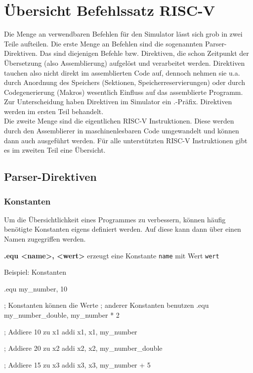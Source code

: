 
\section{Übersicht Befehlssatz RISC-V}

Die Menge an verwendbaren Befehlen für den Simulator lässt sich grob in zwei
Teile aufteilen. Die erste Menge an Befehlen sind die sogenannten
Parser-Direktiven. Das sind diejenigen Befehle bzw. Direktiven, die schon 
Zeitpunkt der Übersetzung (also Assemblierung) aufgelöst und verarbeitet werden.
Direktiven tauchen also nicht direkt im assemblierten Code auf, dennoch nehmen
sie u.a. durch Anordnung des Speichers (Sektionen, Speicherreservierungen) oder
durch Codegenerierung (Makros) wesentlich Einfluss auf das assemblierte
Programm. Zur Unterscheidung haben Direktiven im Simulator ein .-Präfix.
Direktiven werden im ersten Teil behandelt.\\
Die zweite Menge sind die eigentlichen RISC-V Instruktionen. Diese werden durch
den Assemblierer in maschinenlesbaren Code umgewandelt und können dann auch
ausgeführt werden. Für alle unterstützten RISC-V Instruktionen gibt es im
zweiten Teil eine Übersicht.

\subsection{Parser-Direktiven}

\subsubsection{Konstanten}
Um die Übersichtlichkeit eines Programmes zu verbessern, können häufig benötigte
Konstanten eigens definiert werden. Auf diese kann dann über einen Namen
zugegriffen werden.

\textbf{.equ <name>, <wert>} erzeugt eine Konstante \texttt{name} mit Wert
\texttt{wert}

\begin{exampleblock}{Beispiel: Konstanten}
	\begin{riscv}
	.equ my_number, 10

	; Konstanten können die Werte
	; anderer Konstanten benutzen
	.equ my_number_double, my_number * 2

	; Addiere 10 zu x1
	addi x1, x1, my_number

	; Addiere 20 zu x2
	addi x2, x2, my_number_double

	; Addiere 15 zu x3
	addi x3, x3, my_number + 5
	\end{riscv}
\end{exampleblock}


